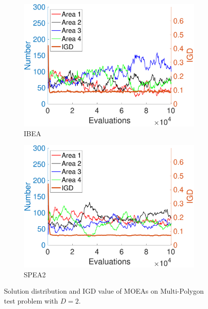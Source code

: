 \documentclass[conference]{IEEEtran}
\begin{document}
\begin{figure}[htbp]
    \begin{subfigure}[b]{.22\textwidth}
    \includegraphics[width=\linewidth]{Section5/dim2/Diversity/IBEA}
    \caption{IBEA}
    \end{subfigure}
    \begin{subfigure}[b]{.22\textwidth}
    \includegraphics[width=\linewidth]{Section5/dim2/Diversity/SPEA2}
    \caption{SPEA2}
    \end{subfigure}
    \caption{Solution distribution and IGD value of MOEAs on Multi-Polygon test problem with $D=2$.}
    \label{fig: MOEAs Diversity dim=2}
\end{figure}
\end{document}
